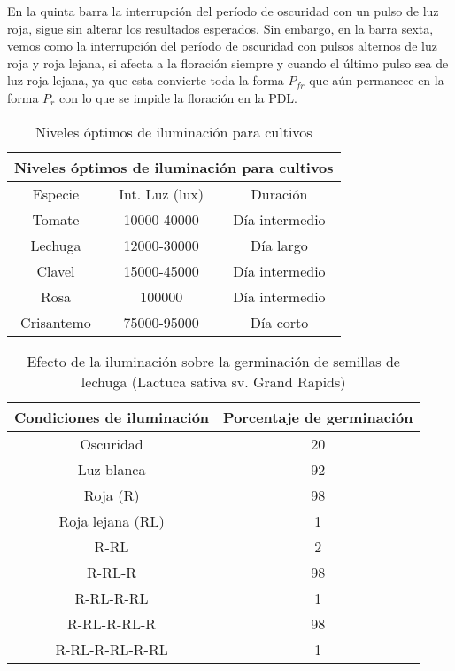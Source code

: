 En la quinta barra la interrupción del período de oscuridad con un pulso de luz roja, sigue sin alterar los resultados esperados. Sin embargo, en la barra sexta, vemos como la interrupción del período de oscuridad con pulsos alternos de luz roja y roja lejana, si afecta  a la floración siempre y cuando el último pulso sea de luz roja lejana, ya que esta convierte toda la forma $P_{fr}$ que aún permanece en la forma $P_r$ con lo que se impide la floración en la PDL.  
\begin{table}[h!]
    \centering
    \begin{tabular}{@{}ccc@{}}
    \toprule
    \multicolumn{3}{c}{Niveles óptimos de iluminación para cultivos} \\ \midrule
    Especie           & Int. Luz (lux)        & Duración             \\
    Tomate            & 10000-40000           & Día intermedio       \\
    Lechuga           & 12000-30000           & Día largo            \\
    Clavel            & 15000-45000           & Día intermedio       \\
    Rosa              & 100000                & Día intermedio       \\
    Crisantemo        & 75000-95000           & Día corto            \\ \bottomrule
    \end{tabular}
    \caption{Niveles óptimos de iluminación para cultivos}
    \label{tabfv6}
\end{table}

\begin{table}[h!]
    \centering
    \begin{tabular}{@{}cc@{}}
    \toprule
    Condiciones de iluminación & Porcentaje de germinación \\ \midrule
    Oscuridad                  & 20                        \\
    Luz blanca                 & 92                        \\
    Roja (R)                   & 98                        \\
    Roja lejana (RL)           & 1                         \\
    R-RL                       & 2                         \\
    R-RL-R                     & 98                        \\
    R-RL-R-RL                  & 1                         \\
    R-RL-R-RL-R                & 98                        \\
    R-RL-R-RL-R-RL             & 1                         \\ \bottomrule
    \end{tabular}
    \caption{Efecto de la iluminación sobre la germinación de semillas de lechuga (Lactuca sativa sv. Grand Rapids)}
    \label{tabfv7}
\end{table}













